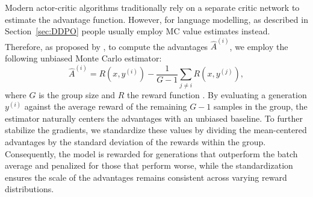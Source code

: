 
Modern actor-critic algorithms traditionally rely on a separate critic network to estimate the advantage function. However, for language modelling, as described in Section~\ref{sec:DDPO} people usually employ MC value estimates instead. Therefore, as proposed by \citeauthor{kool2019unbiasedbaseline} \cite{kool2019unbiasedbaseline}, to compute the advantages $\hat{A}^{(i)}$, we employ the following unbiased Monte Carlo estimator:
\begin{equation}
    \hat{A}^{(i)} = R(x, y^{(i)}) - \frac{1}{G - 1}\sum_{j \neq i}R(x, y^{(j)}),
    \label{eq:advantage estimation}
\end{equation}
where $G$ is the group size and $R$ the reward function \cite{kool2019unbiasedbaseline}. By evaluating a generation $y^{(i)}$ against the average reward of the remaining $G - 1$ samples in the group, the estimator naturally centers the advantages with an unbiased baseline. To further stabilize the gradients, we standardize these values by dividing the mean-centered advantages by the standard deviation of the rewards within the group. Consequently, the model is rewarded for generations that outperform the batch average and penalized for those that perform worse, while the standardization ensures the scale of the advantages remains consistent across varying reward distributions.

